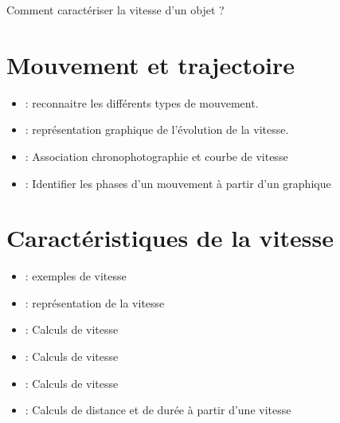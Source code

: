 \documentclass[12pt,a4paper]{article}
\date{}
\title{}
\begin{document}
	
\graphicspath{{./img/}}	



\begin{mypb}
	\begin{center}
		{\Large Comment caractériser la vitesse d'un objet ?}
	\end{center}
\end{mypb}


\section{Mouvement et trajectoire}

%






\begin{myexos}
	\begin{itemize}
		
		\item {}  : reconnaitre les différents types de mouvement.
		\item {}  : représentation graphique de l'évolution de la vitesse.
		\item {}  : Association chronophotographie et courbe de vitesse
		\item {} : Identifier les phases d'un mouvement à partir d'un graphique
	\end{itemize}
\end{myexos}

\section{Caractéristiques de la vitesse}

%






\begin{myexos}
	\begin{itemize}
		\item {}  : exemples de vitesse
		\item {}  : représentation de la vitesse
		\item {}  : Calculs de vitesse
		\item {}  : Calculs de vitesse
		\item {}  : Calculs de vitesse
		\item {}  : Calculs de distance et de durée à partir d'une vitesse
	\end{itemize}
\end{myexos}


\appendix

\end{document}
